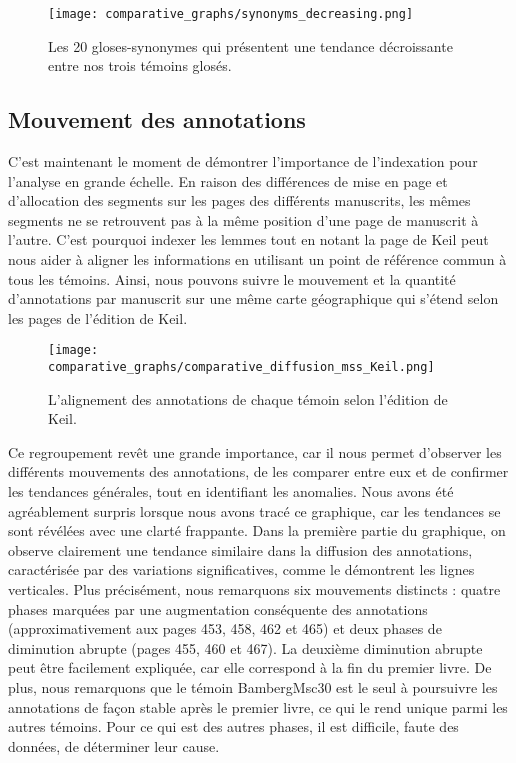 \documentclass[a4paper, twoside, 12pt]{book}
\begin{document}
{\begin{figure}[H]
    \centering
    \texttt{[image: comparative\_graphs/synonyms\_decreasing.png]}
    \caption{Les 20 gloses-synonymes qui présentent une tendance décroissante entre nos trois témoins glosés.}
\end{figure}

\subsection{Mouvement des annotations}


C'est maintenant le moment de démontrer l'importance de l'indexation pour l'analyse en grande échelle. En raison des différences de mise en page et d'allocation des segments sur les pages des différents manuscrits, les mêmes segments ne se retrouvent pas à la même position d'une page de manuscrit à l'autre. C'est pourquoi indexer les lemmes tout en notant la page de Keil peut nous aider à aligner les informations en utilisant un point de référence commun à tous les témoins. Ainsi, nous pouvons suivre le mouvement et la quantité d'annotations par manuscrit sur une même \og{}carte géographique\fg{} qui s'étend selon les pages de l'édition de Keil.\\



\begin{figure}[H]
    \centering
        \texttt{[image: comparative\_graphs/comparative\_diffusion\_mss\_Keil.png]}
    \caption{L'alignement des annotations de chaque témoin selon l'édition de Keil.}
    \label{fig:difusion_annotations}
\end{figure}


Ce regroupement revêt une grande importance, car il nous permet d'observer les différents mouvements des annotations, de les comparer entre eux et de confirmer les tendances générales, tout en identifiant les anomalies. Nous avons été agréablement surpris lorsque nous avons tracé ce graphique, car les tendances se sont révélées avec une clarté frappante. Dans la première partie du graphique, on observe clairement une tendance similaire dans la diffusion des annotations, caractérisée par des variations significatives, comme le démontrent les lignes verticales. Plus précisément, nous remarquons six mouvements distincts : quatre phases marquées par une augmentation conséquente des annotations (approximativement aux pages 453, 458, 462 et 465) et deux phases de diminution abrupte (pages 455, 460 et 467). La deuxième diminution abrupte peut être facilement expliquée, car elle correspond à la fin du premier livre. De plus, nous remarquons que le témoin BambergMsc30 est le seul à poursuivre les annotations de façon stable après le premier livre, ce qui le rend unique parmi les autres témoins. Pour ce qui est des autres phases, il est difficile, faute des données, de déterminer leur cause. \\



}
\end{document}
